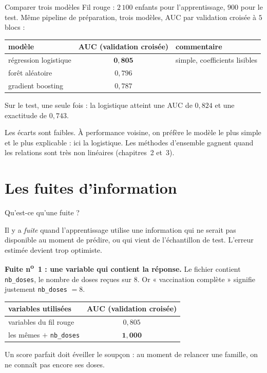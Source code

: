 \documentclass[aspectratio=169,11pt]{beamer}
\begin{document}
\begin{frame}{Comparer trois modèles}
  \small
  Fil rouge : $2\,100$ enfants pour l'apprentissage, $900$ pour le test. Même pipeline de préparation, trois modèles, AUC par validation croisée à $5$ blocs :
  \begin{center}
    \renewcommand{\arraystretch}{1.25}
    \begin{tabular}{lcl}
      \toprule
      modèle & AUC (validation croisée) & commentaire \\
      \midrule
      régression logistique & $\mathbf{0{,}805}$ & simple, coefficients lisibles \\
      forêt aléatoire & $0{,}796$ & \\
      gradient boosting & $0{,}787$ & \\
      \bottomrule
    \end{tabular}
  \end{center}
  Sur le test, une seule fois : la logistique atteint une AUC de $0{,}824$ et une exactitude de $0{,}743$.
  \begin{remarque}[Lecture]
    Les écarts sont faibles. À performance voisine, on préfère le modèle le plus simple et le plus explicable : ici la logistique. Les méthodes d'ensemble gagnent quand les relations sont très non linéaires (chapitres~2 et~3).
  \end{remarque}
\end{frame}

\section{Les fuites d'information}

\begin{frame}{Qu'est-ce qu'une fuite ?}
  \begin{definition}
    Il y a \emph{fuite} quand l'apprentissage utilise une information qui ne serait pas disponible au moment de prédire, ou qui vient de l'échantillon de test. L'erreur estimée devient trop optimiste.
  \end{definition}
  \textbf{Fuite n\textsuperscript{o}~1 : une variable qui contient la réponse.}
  \vskip1mm
  \small
  Le fichier contient \texttt{nb\_doses}, le nombre de doses reçues sur $8$. Or « vaccination complète » signifie justement \texttt{nb\_doses} $=8$.
  \begin{center}
    \renewcommand{\arraystretch}{1.2}
    \begin{tabular}{lc}
      \toprule
      variables utilisées & AUC (validation croisée) \\
      \midrule
      variables du fil rouge & $0{,}805$ \\
      les mêmes $+$ \texttt{nb\_doses} & $\mathbf{1{,}000}$ \\
      \bottomrule
    \end{tabular}
  \end{center}
  {\color{cnfGris}Un score parfait doit éveiller le soupçon : au moment de relancer une famille, on ne connaît pas encore ses doses.}
\end{frame}
\end{document}
